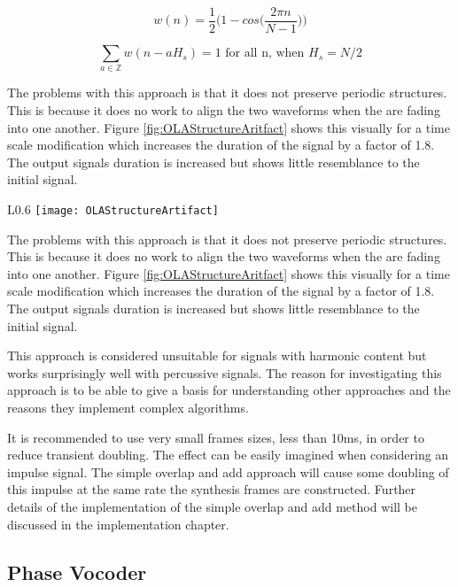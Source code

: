 \begin{equation}\label{eq:HanningWindow}
	w(n) =\frac{1}{2}\Bigg(1-cos\bigg(\frac{2\pi n}{N-1}\bigg)\Bigg)
\end{equation}

\begin{equation}\label{eq:HanningAmplitude}
\sum\limits_{a\in\mathbb{Z}} w(n-aH_s)=1 \text{ for all n, when } H_s = N/2
\end{equation}

The problems with this approach is that it does not preserve periodic structures.
This is because it does no work to align the two waveforms when the are fading
into one another. Figure \ref{fig:OLAStructureAritfact} shows this visually for a
time scale modification which increases the duration of the signal by a factor of
1.8.  The output signals duration is increased but shows little resemblance to the
initial signal.

\begin{wrapfigure}{L}{0.6\textwidth}
	\texttt{[image: OLAStructureArtifact]}
	\caption{OLA harmonic structure distortion\cite{TSMBook}}
	\label{fig:OLAStructureAritfact}
\end{wrapfigure}

The problems with this approach is that it does not preserve periodic structures.
This is because it does no work to align the two waveforms when the are fading
into one another. Figure \ref{fig:OLAStructureAritfact} shows this visually for a
time scale modification which increases the duration of the signal by a factor of
1.8.  The output signals duration is increased but shows little resemblance to the
initial signal.

This approach is considered unsuitable for signals with harmonic content but works
surprisingly well with percussive signals\cite{TSMBook}. The reason for
investigating this approach is to be able to give a basis for understanding other
approaches and the reasons they implement complex algorithms.

It is recommended to use very small frames sizes, less than 10ms, in order to
reduce transient doubling. The effect can be easily imagined when considering an
impulse signal. The simple overlap and add approach will cause some doubling of
this impulse at the same rate the synthesis frames are constructed. Further
details of the implementation of the simple overlap and add method will be
discussed in the implementation chapter.

\subsection{Phase Vocoder}

